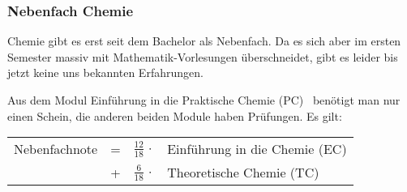 \subsubsection{Nebenfach Chemie}

Chemie gibt es erst seit dem Bachelor als Nebenfach.
Da es sich aber im ersten Semester
massiv mit Mathematik-Vorlesungen überschneidet,
gibt es leider bis jetzt keine uns bekannten Erfahrungen.\\[-3ex]


\begin{center}
\end{center}
Aus dem Modul \glqq Einführung in die Praktische Chemie (PC)\grqq
~benötigt man nur einen Schein,
die anderen beiden Module haben Prüfungen.
Es gilt:\\[0.5ex]
\begin{tabular}{lcrl}
Nebenfachnote & = &$\frac{12}{18}\,\cdot$&Einführung in die Chemie (EC)\\[0.5ex]
              & + &$\frac{6}{18}\,\cdot$&Theoretische Chemie (TC)\\ 
\end{tabular}




